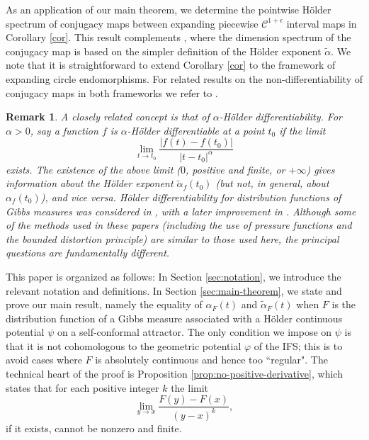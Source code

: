 \documentclass[11pt]{amsart}
\newcommand{\1}{1}
\newtheorem{remark}[theorem]{Remark}
\begin{document}


As an application of our main theorem, we determine the pointwise H\"older spectrum of conjugacy maps between expanding piecewise $\mathcal{C}^{1+\epsilon}$
interval maps in Corollary \ref{cor}. This result complements  \cite[Corollary 2.2]{JS-2020}, where the dimension spectrum of the conjugacy map is based on the simpler definition of the H\"older exponent $\tilde \alpha$. We note that it is straightforward to extend Corollary \ref{cor} to the framework of expanding circle endomorphisms. For related results on the non-differentiability of conjugacy maps in both frameworks we refer to \cite{JKPS-2009}.

\begin{remark}
{\rm
A closely related concept is that of $\alpha$-H\"older differentiability. For $\alpha>0$, say a function $f$ is {\em $\alpha$-H\"older differentiable} at a point $t_0$ if the limit
\[
\lim_{t\to t_0}\frac{|f(t)-f(t_0)|}{|t-t_0|^\alpha}
\]
exists. The existence of the above limit ($0$, positive and finite, or $+\infty$) gives information about the H\"older exponent $\tilde{\alpha}_f(t_0)$ (but not, in general, about $\alpha_f(t_0)$), and vice versa. H\"older differentiability for distribution functions of Gibbs measures was considered in \cite{Falconer-2004, KS-2009}, with a later improvement in \cite{Troscheit}. Although some of the methods used in these papers (including the use of pressure functions and the bounded distortion principle) are similar to those used here, the principal questions are fundamentally different.
}
\end{remark}

This paper is organized as follows: In Section \ref{sec:notation}, we introduce the relevant notation and definitions. In Section \ref{sec:main-theorem}, we state and prove our main result, namely the equality of $\alpha_F(t)$ and $\tilde{\alpha}_F(t)$ when $F$ is the distribution function of a Gibbs measure associated with a H\"older continuous potential $\psi$ on a self-conformal attractor. The only condition we impose on $\psi$ is that it is not cohomologous to the geometric potential $\varphi$ of the IFS; this is to avoid cases where $F$ is absolutely continuous and hence too ``regular". The technical heart of the proof is Proposition \ref{prop:no-positive-derivative}, which states that  for each positive integer $k$ the limit
\[
\lim_{y\to x}\frac{F(y)-F(x)}{(y-x)^k},
\]
if it exists, cannot be nonzero and finite.
\end{document}
